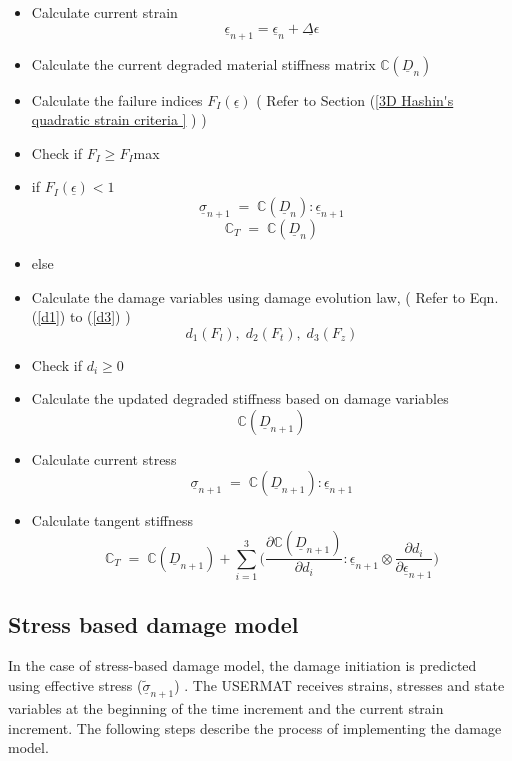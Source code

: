 \documentclass[12pt,a4paper,twoside,openright]{report}
\begin{document}
\begin{itemize}
\item Calculate current strain \textbf{$$ \underline{\epsilon}_{n+1} = \underline{\epsilon}_{n} + \underline{\Delta \epsilon} $$}
\item Calculate the current degraded material stiffness matrix  \textbf{$\mathbb{C}(\underline{D}_{n})$}
\item Calculate the failure indices \textbf{$F_{I}(\underline{\epsilon})$} \;\; ( Refer to Section (\ref{3D Hashin's quadratic strain criteria } ) )
\item[] Check if $F_{I} \geq F_{I}$max
\item if \textbf{$F_{I}(\underline{\epsilon})<1$} \textbf{$$\underline{\sigma}_{n+1} \; = \; \mathbb{C}(\underline{D}_{n}) :  \underline{\epsilon}_{n+1} $$} \textbf{$$\mathbb{C}_{T} \; = \; \mathbb{C}(\underline{D}_{n})$$}
\item else
\item[]  Calculate the damage variables using damage evolution law, \;\; ( Refer to Eqn. (\ref{d1}) to (\ref{d3}) ) \textbf{$$d_{1}(F_{l}),\;d_{2}(F_{t}),\;d_{3}(F_{z})$$}
\item[]  Check if $d_{i} \geq 0 $ 
\item[]  Calculate the updated degraded stiffness based on damage variables \textbf{$$\mathbb{C}(\underline{D}_{n+1})$$}
\item[]  Calculate current stress  \textbf{$$\underline{\sigma}_{n+1} \; = \; \mathbb{C}(\underline{D}_{n+1}) :  \underline{\epsilon}_{n+1} $$}
\item[] Calculate tangent stiffness \textbf{$$\mathbb{C}_{T}  \; = \;\mathbb{C}(\underline{D}_{n+1}) + \sum_{i = 1}^{3} \Big( \frac{\partial \mathbb{C}(\underline{D}_{n+1}) }{\partial d_{i}} : \underline{\epsilon}_{n+1} \otimes \frac{\partial d_{i}}{\partial \underline{\epsilon}_{n+1} }\Big)$$}
	
\end{itemize} 


\subsection{Stress based damage model}
\indent\indent\indent  In the case of stress-based damage model, the damage initiation is predicted using effective stress ($\underline{\tilde{\sigma}}_{n+1}$) \citep{jiang2018evaluations}.  The USERMAT receives strains, stresses and state variables at the beginning of the time increment and the current strain increment. The following steps describe the process of implementing the damage model.
\end{document}
